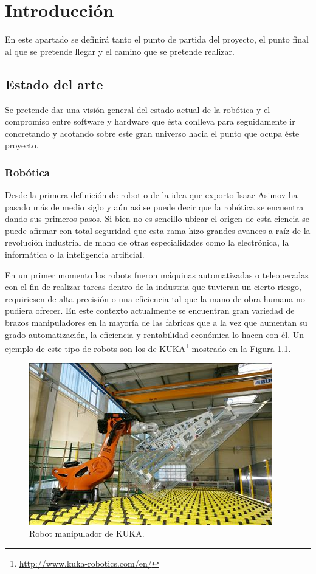 \documentclass[12pt,a4paper,final,twoside]{book}
\begin{document}
\chapter{Introducción}
\thispagestyle{fancy}
En este apartado se definirá tanto el punto de partida del proyecto, el punto final al que se pretende llegar y el camino que se pretende realizar. 
 
\section{Estado del arte}\label{estatdelart}
Se pretende dar una visión general del estado actual de la robótica y el compromiso entre software y hardware que ésta conlleva para seguidamente ir concretando y acotando sobre este gran universo hacia el punto que ocupa éste proyecto. 

\subsection{Robótica}

Desde la primera definición de robot o de la idea que exporto Isaac Asimov ha pasado más de medio siglo y aún así se puede decir que la robótica se encuentra dando sus primeros pasos. Si bien no es sencillo ubicar el origen de esta ciencia se puede afirmar con total seguridad que esta rama hizo grandes avances a raíz de la revolución industrial de mano de otras especialidades como la electrónica, la informática o la inteligencia artificial.

En un primer momento los robots fueron máquinas automatizadas o teleoperadas con el fin de realizar tareas dentro de la industria que tuvieran un cierto riesgo, requiriesen de alta precisión o una eficiencia tal que la mano de obra humana no pudiera ofrecer. En este contexto actualmente se encuentran gran variedad de brazos manipuladores en la mayoría de las fabricas que a la vez que aumentan su grado automatización, la eficiencia y rentabilidad económica lo hacen con él\cite{libroblanco}. Un ejemplo de este tipo de robots son los de KUKA\footnote{\url{http://www.kuka-robotics.com/en/}} mostrado en la Figura \ref{fig:kuka}.
 
\begin{figure}[h!]
	\centering
    \includegraphics[scale=3]	{images/kuka.jpg}
	 \caption{Robot manipulador de KUKA.}
  \label{fig:kuka}
\end{figure}
\end{document}
